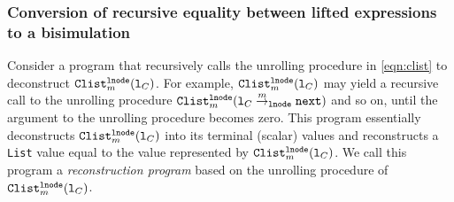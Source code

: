 \subsubsection{Conversion of recursive equality between lifted expressions to
a bisimulation}
\label{sec:recursiveEqToBisim}
Consider a
program that recursively calls
the unrolling procedure in \cref{eqn:clist}
to deconstruct
${\tt Clist}_m^{{\tt lnode}}({\tt l}_C)$.
For example,
${\tt Clist}_m^{{\tt lnode}}({\tt l}_C)$
may yield a recursive call
to the unrolling procedure
${\tt Clist}_m^{{\tt lnode}}({{\tt l}_C} \overset{m}{\rightarrow}_{{\tt \tt lnode}} {{{\tt next}}})$
and so on, until the argument to
the unrolling procedure becomes zero.
This program essentially deconstructs ${\tt Clist}_m^{{\tt lnode}}({\tt l}_C)$
into its terminal (scalar) values and reconstructs
a {\tt List} value equal to the value
represented by ${\tt Clist}_m^{{\tt lnode}}({\tt l}_C)$.
We call this program a {\em reconstruction program} based
on the unrolling procedure of
${\tt Clist}_m^{{\tt lnode}}({\tt l}_C)$.

